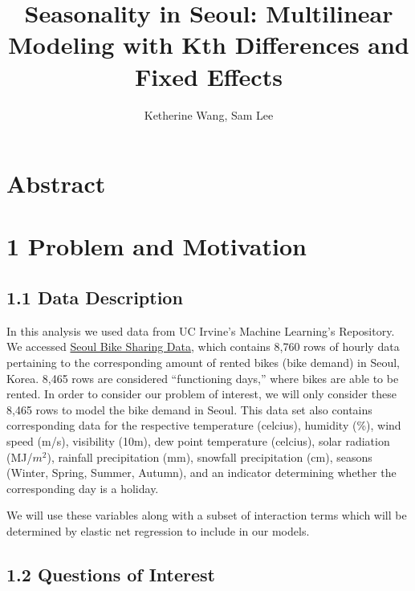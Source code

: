 \documentclass[
  letterpaper,
  DIV=11,
  numbers=noendperiod]{scrartcl}
\title{Seasonality in Seoul: Multilinear Modeling with Kth Differences
and Fixed Effects}
\author{Ketherine Wang, Sam Lee}
\date{}
\begin{document}
\maketitle
\ifdefined\Shaded\renewenvironment{Shaded}{\begin{tcolorbox}[boxrule=0pt, interior hidden, frame hidden, sharp corners, breakable, borderline west={3pt}{0pt}{shadecolor}, enhanced]}{\end{tcolorbox}}\fi

\newpage

\hypertarget{abstract}{%
\section{Abstract}\label{abstract}}

\hypertarget{problem-and-motivation}{%
\section{1 Problem and Motivation}\label{problem-and-motivation}}

\hypertarget{data-description}{%
\subsection{1.1 Data Description}\label{data-description}}

In this analysis we used data from UC Irvine's Machine Learning's
Repository. We accessed
\href{https://archive.ics.uci.edu/dataset/560/seoul+bike+sharing+demand}{Seoul
Bike Sharing Data}, which contains 8,760 rows of hourly data pertaining
to the corresponding amount of rented bikes (bike demand) in Seoul,
Korea. 8,465 rows are considered ``functioning days,'' where bikes are
able to be rented. In order to consider our problem of interest, we will
only consider these 8,465 rows to model the bike demand in Seoul. This
data set also contains corresponding data for the respective temperature
(celcius), humidity (\%), wind speed (m/s), visibility (10m), dew point
temperature (celcius), solar radiation (MJ/\(m^2\)), rainfall
precipitation (mm), snowfall precipitation (cm), seasons (Winter,
Spring, Summer, Autumn), and an indicator determining whether the
corresponding day is a holiday.

We will use these variables along with a subset of interaction terms
which will be determined by elastic net regression to include in our
models.

\hypertarget{questions-of-interest}{%
\subsection{1.2 Questions of Interest}\label{questions-of-interest}}
\end{document}
